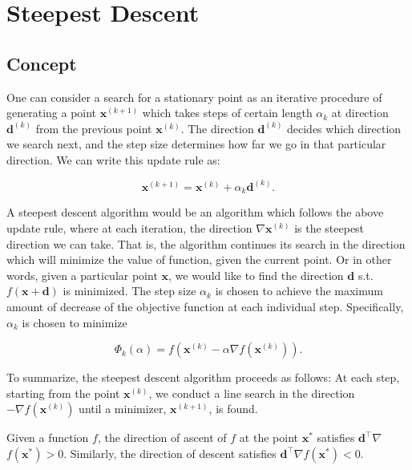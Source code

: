 \section{Steepest Descent}

\subsection{Concept}
One can consider a search for a stationary point as an iterative procedure of generating a point \(\boldsymbol{x}^{(k+1)}\) which takes steps of certain length \(\alpha_{k}\) at direction \(\boldsymbol{d}^{(k)}\) from the previous point \(\boldsymbol{x}^{(k)}\). The direction \(\boldsymbol{d}^{(k)}\) decides which direction we search next, and the step size determines how far we go in that particular direction. We can write this update rule as:

\[
	\boldsymbol{x}^{(k+1)}=\boldsymbol{x}^{(k)}+\alpha_{k} \boldsymbol{d}^{(k)} .
\]

A steepest descent algorithm would be an algorithm which follows the above update rule, where at each iteration, the direction \(\nabla \boldsymbol{x}^{(k)}\) is the steepest direction we can take. That is, the algorithm continues its search in the direction which will minimize the value of function, given the current point. Or in other words, given a particular point \(\boldsymbol{x}\), we would like to find the direction \(\boldsymbol{d}\) s.t. \(f(\boldsymbol{x}+\boldsymbol{d})\) is minimized. The step size \(\alpha_{k}\) is chosen to achieve the maximum amount of decrease of the objective function at each individual step. Specifically, \(\alpha_{k}\) is chosen to minimize

\[
	\Phi_{k}(\alpha)=f\left(\boldsymbol{x}^{(k)}-\alpha \nabla f\left(\boldsymbol{x}^{(k)}\right)\right) .
\]

To summarize, the steepest descent algorithm proceeds as follows: At each step, starting from the point \(\boldsymbol{x}^{(k)}\), we conduct a line search in the direction \(-\nabla f\left(\boldsymbol{x}^{(k)}\right)\) until a minimizer, \(\boldsymbol{x}^{(k+1)}\), is found.

Given a function \(f\), the direction of ascent of \(f\) at the point \(\boldsymbol{x}^{*}\) satisfies \(\boldsymbol{d}^{\top} \nabla\) \(f\left(\boldsymbol{x}^{*}\right)>0\). Similarly, the direction of descent satisfies \(\boldsymbol{d}^{\top} \nabla f\left(\boldsymbol{x}^{*}\right)<0\).

